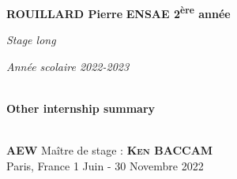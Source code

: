 \begin{titlepage}
\begin{center}

\begin{minipage}{1\textwidth}
\Large{\textbf{ROUILLARD Pierre}} 
\hfill
\large{\textbf{ENSAE 2\textsuperscript{ère} année}}\par
\vspace{0cm}
\hfill \normalsize{\textit{Stage long}}\par
\hfill \normalsize{\textit{Année scolaire 2022-2023}}  
\end{minipage}

\vspace{8cm}

\begin{center}

\HRule \\[1cm]
{\huge \bfseries{Other internship summary}}\\[0.5cm]
\HRule \\[2.5cm]

\end{center}

\vfill

\begin{minipage}{1\textwidth}
\begin{flushleft}
\large{\textbf{\textsc{AEW}}} \hfill \small{Maître de stage :} \large{\textbf{\textsc{Ken BACCAM}}} \\ 
\small{Paris, France} \hfill \small{1 Juin - 30 Novembre 2022}
\end{flushleft}
\end{minipage}

\end{center}
\end{titlepage}